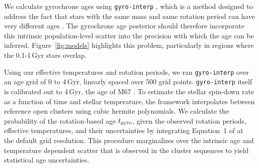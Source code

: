 \documentclass[11pt,twocolumn,tighten]{aastex63}
\begin{document}
\begin{figure*}[!t]
	\begin{center}
		\leavevmode
	\end{center}
	\vspace{-0.6cm}
	\caption{
		{\bf The models.}
    Points represent $10^4$ draws from models that have been fitted to
    rotation periods \citep{Bouma_2023} and lithium equivalent widths
    \citep[EWs;][]{Jeffries_2023} of stars in open clusters.  Lines
    are the ``mean models'' at various ages; the intrinsic dispersion
    in rotation and lithium about these mean models, which is what the
    models fit, sets the theoretical precision floor for the
    age-dating methods.    Additional sources of uncertainty,
    including measurement uncertainty, impose further limits on
    achievable precision.  These models are calibrated using open
    clusters younger than 4\,Gyr.  The displayed points assume a
    uniform distribution in temperature for visual clarity.  The sizes
    of the points are the same in each panel, so that low apparent
    density signifies greater dispersion around the mean.
		\label{fig:models}
	}
\end{figure*}

We calculate gyrochrone ages using \texttt{gyro-interp}
\citep{Bouma_2023}, which is a method designed to address the fact
that stars with the same mass and same rotation period can have very
different ages \citep[e.g.][]{Curtis_2019_ngc6811}.  The gyrochrone
age posterior should therefore incorporate this intrinsic
population-level scatter into the precision with which the age can be
inferred.  Figure~\ref{fig:models} highlights this problem,
particularly in regions where the 0.1-1\,Gyr stars overlap.

Using our effective temperatures and rotation periods, we ran
\texttt{gyro-interp} over an age grid of 0 to 4\,Gyr, linearly spaced
over 500 grid points.  \texttt{gyro-interp} itself is calibrated out
to 4\,Gyr, the age of M67
\citep[see][]{2022ApJ...938..118D,Gruner_2023}.  To estimate the
stellar spin-down rate as a function of time and stellar temperature,
the framework interpolates between reference open clusters using cubic
hermite polynomials.  We calculate the probability of the
rotation-based age $t_{\rm gyro}$, given the observed rotation
periods, effective temperatures, and their uncertainties by
integrating Equation~1 of \citet{Bouma_2023} at the default grid
resolution.  This procedure marginalizes over the intrinsic age and
temperature dependent scatter that is observed in the cluster
sequences to yield statistical age uncertainties.
\end{document}
